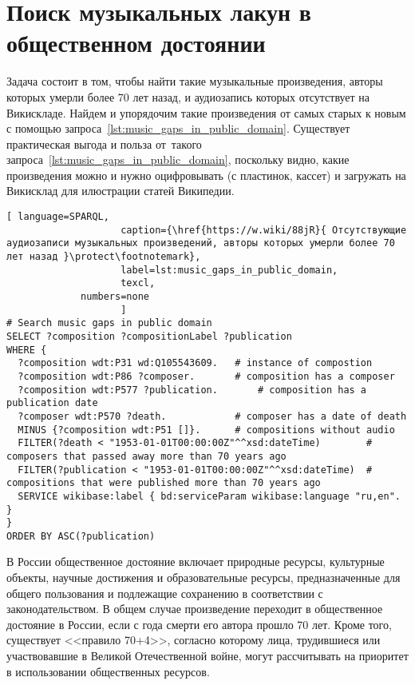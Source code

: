 \section{Поиск музыкальных лакун в общественном достоянии}
Задача состоит в том, чтобы найти такие музыкальные произведения, авторы которых умерли более 70 лет назад, и аудиозапись которых отсутствует на Викискладе. Найдем и упорядочим такие произведения от самых старых к новым с помощью запроса~\ref{lst:music_gaps_in_public_domain}. Существует практическая выгода и польза от~такого запроса~\ref{lst:music_gaps_in_public_domain}, поскольку видно, какие произведения можно и нужно оцифровывать (с пластинок, кассет) и загружать на Викисклад для илюстрации статей Википедии.

\begin{lstlisting}[ language=SPARQL,
                    caption={\href{https://w.wiki/88jR}{ Отсутствующие аудиозаписи музыкальных произведений, авторы которых умерли более 70 лет назад }\protect\footnotemark},
                    label=lst:music_gaps_in_public_domain,
                    texcl,
	         numbers=none
                    ]
# Search music gaps in public domain
SELECT ?composition ?compositionLabel ?publication
WHERE {
  ?composition wdt:P31 wd:Q105543609.	# instance of compostion
  ?composition wdt:P86 ?composer.		# composition has a composer
  ?composition wdt:P577 ?publication.		# composition has a publication date
  ?composer wdt:P570 ?death.			# composer has a date of death
  MINUS {?composition wdt:P51 []}.		# compositions without audio 
  FILTER(?death < "1953-01-01T00:00:00Z"^^xsd:dateTime)        # composers that passed away more than 70 years ago
  FILTER(?publication < "1953-01-01T00:00:00Z"^^xsd:dateTime)  # compositions that were published more than 70 years ago
  SERVICE wikibase:label { bd:serviceParam wikibase:language "ru,en". }
}
ORDER BY ASC(?publication)
\end{lstlisting}%

В России общественное достояние включает природные ресурсы, культурные объекты, научные достижения и образовательные ресурсы, предназначенные для общего пользования и подлежащие сохранению в соответствии с законодательством. В общем случае произведение переходит в общественное достояние в России, если с года смерти его автора прошло 70 лет. Кроме того, существует <<правило 70+4>>, согласно которому лица, трудившиеся или участвовавшие в Великой Отечественной войне, могут рассчитывать на приоритет в использовании общественных ресурсов.

